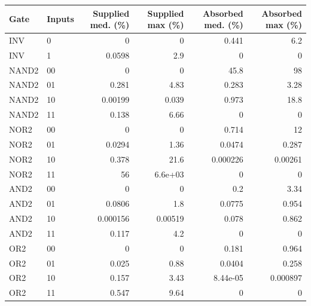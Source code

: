 \begin{tabular}{llrrrr}
\toprule
Gate & Inputs & Supplied med. (\%) & Supplied max (\%) & Absorbed med. (\%) & Absorbed max (\%) \\
\midrule
INV & 0 & 0 & 0 & 0.441 & 6.2 \\
INV & 1 & 0.0598 & 2.9 & 0 & 0 \\
\midrule
NAND2 & 00 & 0 & 0 & 45.8 & 98 \\
NAND2 & 01 & 0.281 & 4.83 & 0.283 & 3.28 \\
NAND2 & 10 & 0.00199 & 0.039 & 0.973 & 18.8 \\
NAND2 & 11 & 0.138 & 6.66 & 0 & 0 \\
\midrule
NOR2 & 00 & 0 & 0 & 0.714 & 12 \\
NOR2 & 01 & 0.0294 & 1.36 & 0.0474 & 0.287 \\
NOR2 & 10 & 0.378 & 21.6 & 0.000226 & 0.00261 \\
NOR2 & 11 & 56 & 6.6e+03 & 0 & 0 \\
\midrule
AND2 & 00 & 0 & 0 & 0.2 & 3.34 \\
AND2 & 01 & 0.0806 & 1.8 & 0.0775 & 0.954 \\
AND2 & 10 & 0.000156 & 0.00519 & 0.078 & 0.862 \\
AND2 & 11 & 0.117 & 4.2 & 0 & 0 \\
\midrule
OR2 & 00 & 0 & 0 & 0.181 & 0.964 \\
OR2 & 01 & 0.025 & 0.88 & 0.0404 & 0.258 \\
OR2 & 10 & 0.157 & 3.43 & 8.44e-05 & 0.000897 \\
OR2 & 11 & 0.547 & 9.64 & 0 & 0 \\
\bottomrule
\end{tabular}
